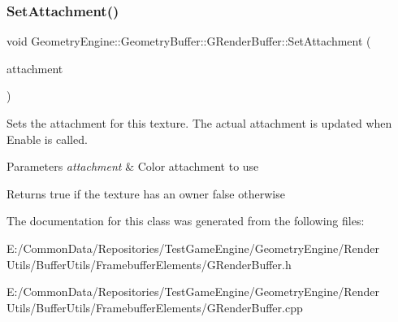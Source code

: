 \subsubsection{\texorpdfstring{SetAttachment()}{SetAttachment()}\hspace{0.1cm}{\footnotesize\ttfamily [2/2]}}
{\footnotesize\ttfamily void Geometry\+Engine\+::\+Geometry\+Buffer\+::\+G\+Render\+Buffer\+::\+Set\+Attachment (\begin{DoxyParamCaption}\item[{G\+Framebuffer\+Commons\+::\+G\+\_\+\+C\+O\+L\+O\+R\+\_\+\+A\+T\+T\+A\+C\+H\+M\+E\+N\+TS}]{attachment }\end{DoxyParamCaption})}

Sets the attachment for this texture. The actual attachment is updated when Enable is called. 
\begin{DoxyParams}{Parameters}
{\em attachment} & Color attachment to use \\
\hline
\end{DoxyParams}
\begin{DoxyReturn}{Returns}
true if the texture has an owner false otherwise 
\end{DoxyReturn}


The documentation for this class was generated from the following files\+:\begin{DoxyCompactItemize}
\item 
E\+:/\+Common\+Data/\+Repositories/\+Test\+Game\+Engine/\+Geometry\+Engine/\+Render Utils/\+Buffer\+Utils/\+Framebuffer\+Elements/G\+Render\+Buffer.\+h\item 
E\+:/\+Common\+Data/\+Repositories/\+Test\+Game\+Engine/\+Geometry\+Engine/\+Render Utils/\+Buffer\+Utils/\+Framebuffer\+Elements/G\+Render\+Buffer.\+cpp\end{DoxyCompactItemize}
